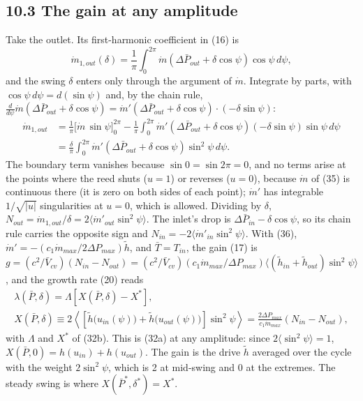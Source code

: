 \documentclass[11pt]{article}
\begin{document}
\subsection*{10.3 The gain at any amplitude}

Take the outlet. Its first-harmonic coefficient in (16) is
\begin{equation}
\dot m_{1,out}(\delta) = \frac{1}{\pi}\int_0^{2\pi}\dot m\left(\Delta\bar P_{out} + \delta\cos\psi\right)\cos\psi\,d\psi , \tag{37a}
\end{equation}
and the swing $\delta$ enters only through the argument of $\dot m$. Integrate by parts, with $\cos\psi\,d\psi = d(\sin\psi)$ and, by the chain rule, $\frac{d}{d\psi}\dot m(\Delta\bar P_{out} + \delta\cos\psi) = \dot m'(\Delta\bar P_{out} + \delta\cos\psi)\cdot(-\delta\sin\psi)$:
\[
\begin{aligned}
\dot m_{1,out} &= \frac{1}{\pi}\Big[\dot m\,\sin\psi\Big]_0^{2\pi} - \frac{1}{\pi}\int_0^{2\pi}\dot m'\left(\Delta\bar P_{out} + \delta\cos\psi\right)(-\delta\sin\psi)\sin\psi\,d\psi \\
&= \frac{\delta}{\pi}\int_0^{2\pi}\dot m'\left(\Delta\bar P_{out} + \delta\cos\psi\right)\sin^2\psi\,d\psi .
\end{aligned}
\]
The boundary term vanishes because $\sin 0 = \sin 2\pi = 0$, and no terms arise at the points where the reed shuts ($u = 1$) or reverses ($u = 0$), because $\dot m$ of (35) is continuous there (it is zero on both sides of each point); $\dot m'$ has integrable $1/\sqrt{\lvert u\rvert}$ singularities at $u = 0$, which is allowed. Dividing by $\delta$, $N_{out} = \dot m_{1,out}/\delta = 2\langle\dot m'_{out}\sin^2\psi\rangle$. The inlet's drop is $\Delta\bar P_{in} - \delta\cos\psi$, so its chain rule carries the opposite sign and $N_{in} = -2\langle\dot m'_{in}\sin^2\psi\rangle$. With (36), $\dot m' = -(c_1\dot m_{max}/2\Delta P_{max})\tilde h$, and $\bar T = T_{in}$, the gain (17) is $g = (c^2/\bar V_{cv})(N_{in} - N_{out}) = (c^2/\bar V_{cv})(c_1\dot m_{max}/\Delta P_{max})\langle(\tilde h_{in} + \tilde h_{out})\sin^2\psi\rangle$, and the growth rate (20) reads
\begin{equation}
\begin{gathered}
\lambda(\bar P,\delta) = \Lambda\left[X(\bar P,\delta) - X^*\right], \\
X(\bar P,\delta) \equiv 2\left\langle\left[\tilde h\big(u_{in}(\psi)\big) + \tilde h\big(u_{out}(\psi)\big)\right]\sin^2\psi\right\rangle = \frac{2\Delta P_{max}}{c_1\dot m_{max}}\left(N_{in} - N_{out}\right),
\end{gathered} \tag{37}
\end{equation}
with $\Lambda$ and $X^*$ of (32b). This is (32a) at any amplitude: since $2\langle\sin^2\psi\rangle = 1$, $X(\bar P, 0) = h(u_{in}) + h(u_{out})$. The gain is the drive $\tilde h$ averaged over the cycle with the weight $2\sin^2\psi$, which is 2 at mid-swing and 0 at the extremes. The steady swing is where $X(\bar P^*, \delta^*) = X^*$.
\end{document}

